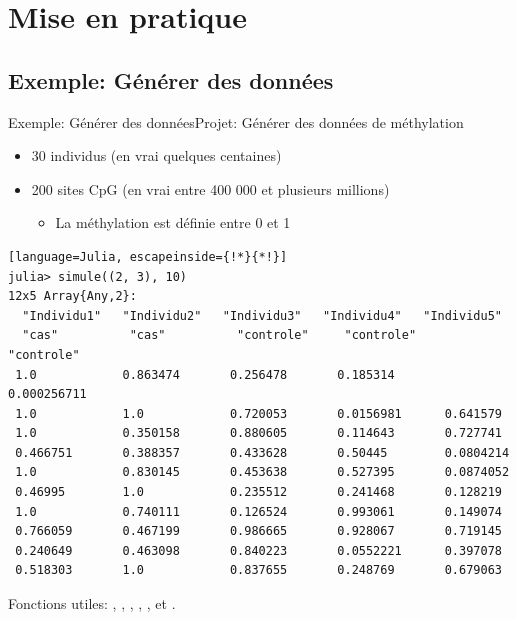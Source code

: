\section{Mise en pratique}
\subsection{Exemple: Générer des données}
\begin{frame}[containsverbatim]{\textcolor{goldenrod2}{Exemple:} Générer des données}{Projet: Générer des données de méthylation}
    \begin{itemize}
        \item 30 individus (en vrai quelques centaines)
        \vspace{2ex}
        \item 200 sites CpG (en vrai entre 400 000 et plusieurs millions)
        \vspace{2ex}
            \begin{itemize}
                \item La méthylation est définie entre 0 et 1
            \end{itemize}
    \end{itemize}
    \begin{lstlisting}[language=Julia, escapeinside={!*}{*!}]
julia> simule((2, 3), 10)
12x5 Array{Any,2}:
  "Individu1"   "Individu2"   "Individu3"   "Individu4"   "Individu5"
  "cas"          "cas"          "controle"     "controle"     "controle"
 1.0            0.863474       0.256478       0.185314       0.000256711
 1.0            1.0            0.720053       0.0156981      0.641579
 1.0            0.350158       0.880605       0.114643       0.727741
 0.466751       0.388357       0.433628       0.50445        0.0804214
 1.0            0.830145       0.453638       0.527395       0.0874052
 0.46995        1.0            0.235512       0.241468       0.128219
 1.0            0.740111       0.126524       0.993061       0.149074
 0.766059       0.467199       0.986665       0.928067       0.719145
 0.240649       0.463098       0.840223       0.0552221      0.397078
 0.518303       1.0            0.837655       0.248769       0.679063

\end{lstlisting}
    \par{Fonctions utiles: , , , , , \cmdb{\textquotesingle} et .}
\end{frame}


